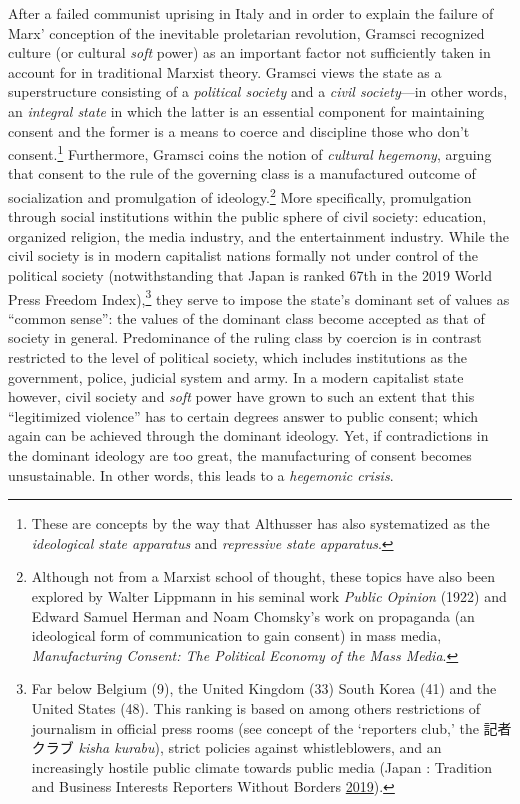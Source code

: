 \documentclass[10pt,british,A4paper,,openany]{memoir}
\begin{document}
After a failed communist uprising in Italy and in order to explain the
failure of Marx' conception of the inevitable proletarian revolution,
Gramsci recognized culture (or cultural \emph{soft} power) as an
important factor not sufficiently taken in account for in traditional
Marxist theory. Gramsci views the state as a superstructure consisting
of a \emph{political society} and a \emph{civil society}---in other
words, an \emph{integral state} in which the latter is an essential
component for maintaining consent and the former is a means to coerce
and discipline those who don't consent.\footnote{These are concepts by
  the way that Althusser has also systematized as the \emph{ideological
  state apparatus} and \emph{repressive state apparatus}.} Furthermore,
Gramsci coins the notion of \emph{cultural hegemony}, arguing that
consent to the rule of the governing class is a manufactured outcome of
socialization and promulgation of ideology.\footnote{Although not from a
  Marxist school of thought, these topics have also been explored by
  Walter Lippmann in his seminal work \emph{Public Opinion} (1922) and
  Edward Samuel Herman and Noam Chomsky's work on propaganda (an
  ideological form of communication to gain consent) in mass media,
  \emph{Manufacturing Consent: The Political Economy of the Mass Media}.}
More specifically, promulgation through social institutions within the
public sphere of civil society: education, organized religion, the media
industry, and the entertainment industry. While the civil society is in
modern capitalist nations formally not under control of the political
society (notwithstanding that Japan is ranked 67th in the 2019 World
Press Freedom Index),\footnote{Far below Belgium (9), the United Kingdom
  (33) South Korea (41) and the United States (48). This ranking is
  based on among others restrictions of journalism in official press
  rooms (see concept of the `reporters club,' the 記者クラブ \emph{kisha
  kurabu}), strict policies against whistleblowers, and an increasingly
  hostile public climate towards public media (Japan : Tradition and
  Business Interests Reporters Without Borders
  \protect\hyperlink{ref-noauthor_japan_2019}{2019}).} they serve to
impose the state's dominant set of values as ``common sense'': the
values of the dominant class become accepted as that of society in
general. Predominance of the ruling class by coercion is in contrast
restricted to the level of political society, which includes
institutions as the government, police, judicial system and army. In a
modern capitalist state however, civil society and \emph{soft} power
have grown to such an extent that this ``legitimized violence'' has to
certain degrees answer to public consent; which again can be achieved
through the dominant ideology. Yet, if contradictions in the dominant
ideology are too great, the manufacturing of consent becomes
unsustainable. In other words, this leads to a \emph{hegemonic crisis}.
\end{document}
